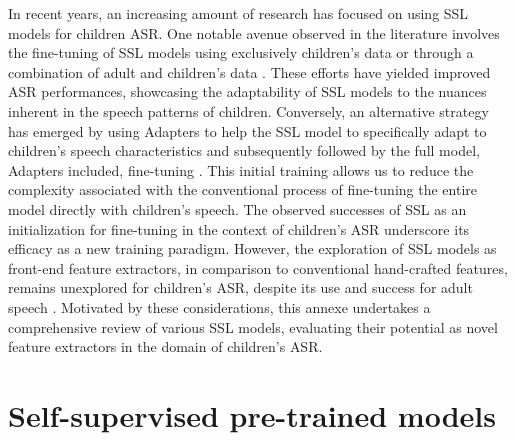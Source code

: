 In recent years, an increasing amount of research has focused on using \ac{SSL} models for children \ac{ASR}. One notable avenue observed in the literature involves the fine-tuning of \ac{SSL} models using exclusively children's data \cite{jain2023adaptation} or through a combination of adult and children's data \cite{jain2023wav2vec2}. These efforts have yielded improved \ac{ASR} performances, showcasing the adaptability of \ac{SSL} models to the nuances inherent in the speech patterns of children. Conversely, an alternative strategy has emerged by using Adapters to help the \ac{SSL} model to specifically adapt to children's speech characteristics and subsequently followed by the full model, Adapters included, fine-tuning \cite{fan2022draft}. This initial training allows us to reduce the complexity associated with the conventional process of fine-tuning the entire model directly with children's speech.
The observed successes of \ac{SSL} as an initialization for fine-tuning in the context of children's \ac{ASR} underscore its efficacy as a new training paradigm. However, the exploration of \ac{SSL} models as front-end feature extractors, in comparison to conventional hand-crafted features, remains unexplored for children's \ac{ASR}, despite its use and success for adult speech \cite{yang21c_interspeech,chang2021exploration}. Motivated by these considerations, this annexe undertakes a comprehensive review of various \ac{SSL} models, evaluating their potential as novel feature extractors in the domain of children's \ac{ASR}.
\section{Self-supervised pre-trained models}

